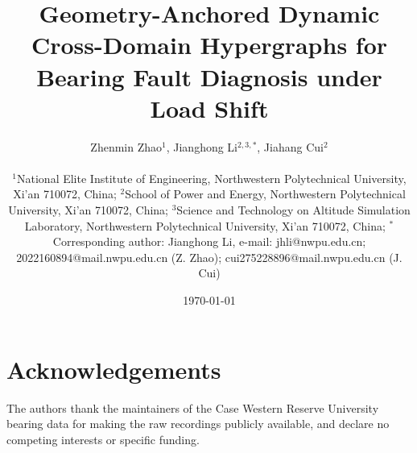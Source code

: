 \documentclass[twocolumn,10pt]{article}
\title{Geometry-Anchored Dynamic Cross-Domain Hypergraphs for\\[2pt]
Bearing Fault Diagnosis under Load Shift}
\author{%
Zhenmin Zhao$^{1}$, Jianghong Li$^{2,3,\ast}$, Jiahang Cui$^{2}$\\[6pt]
\footnotesize
\parbox{0.92\textwidth}{\centering
$^{1}$National Elite Institute of Engineering, Northwestern Polytechnical University, Xi'an 710072, China; $^{2}$School of Power and Energy, Northwestern Polytechnical University, Xi'an 710072, China; $^{3}$Science and Technology on Altitude Simulation Laboratory, Northwestern Polytechnical University, Xi'an 710072, China; $^{\ast}$Corresponding author: Jianghong Li, e-mail: jhli@nwpu.edu.cn; 2022160894@mail.nwpu.edu.cn (Z. Zhao); cui275228896@mail.nwpu.edu.cn (J. Cui)}%
}
\date{\today}
\begin{document}
\maketitle










\section*{Acknowledgements}
The authors thank the maintainers of the Case Western Reserve University
bearing data for making the raw recordings publicly available, and declare no
competing interests or specific funding.


\end{document}
